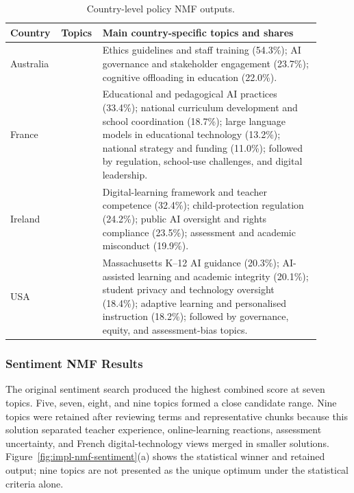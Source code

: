 \begin{table}[ht]
\centering
\footnotesize
\begin{tabular}{
  >{\centering\arraybackslash}p{0.12\linewidth}
  >{\centering\arraybackslash}p{0.10\linewidth}
  >{\raggedright\arraybackslash}p{0.68\linewidth}}
\hline
Country & Topics & Main country-specific topics and shares \\
\hline
Australia & 3 & Ethics guidelines and staff training (54.3\%); AI governance and
stakeholder engagement (23.7\%); cognitive offloading in education (22.0\%). \\
France & 7 & Educational and pedagogical AI practices (33.4\%); national
curriculum development and school coordination (18.7\%); large language models in
educational technology (13.2\%); national strategy and funding (11.0\%); followed by
regulation, school-use challenges, and digital leadership. \\
Ireland & 4 & Digital-learning framework and teacher competence (32.4\%);
child-protection regulation (24.2\%); public AI oversight and rights compliance
(23.5\%); assessment and academic misconduct (19.9\%). \\
USA & 7 & Massachusetts K--12 AI guidance (20.3\%); AI-assisted learning and
academic integrity (20.1\%); student privacy and technology oversight (18.4\%);
adaptive learning and personalised instruction (18.2\%); followed by governance,
equity, and assessment-bias topics. \\
\hline
\end{tabular}
\caption{Country-level policy NMF outputs.}
\label{tab:impl-nmf-policy-countries}
\end{table}



\subsubsection*{Sentiment NMF Results}

The original sentiment search produced the highest combined score at seven topics.
Five, seven, eight, and nine topics formed a close candidate range. Nine topics were
retained after reviewing terms and representative chunks because this solution
separated teacher experience, online-learning reactions, assessment uncertainty, and
French digital-technology views merged in smaller solutions.
Figure~\ref{fig:impl-nmf-sentiment}(a) shows the statistical winner and retained
output; nine topics are not presented as the unique optimum under the statistical
criteria alone.

